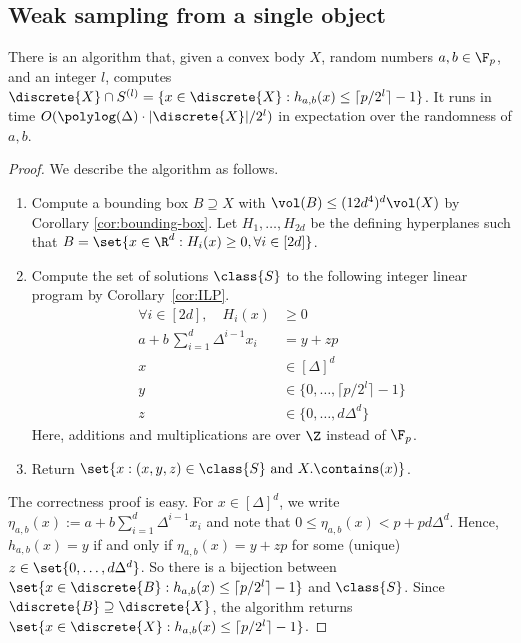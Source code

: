\subsection{Weak sampling from a single object}
\begin{lemma}
    \label{lem:single-weak-sample}
    There is an algorithm  that, given a convex body $X$, random numbers $a,b \in \F_p$, and an integer $l$, computes $\discrete{X} \cap S^{(l)} = \{x \in \discrete{X} : h_{a,b}(x) \leq \lceil p/2^l \rceil - 1\}$. It runs in time $O(\polylog(\Delta) \cdot |\discrete{X}| / 2^l)$ in expectation over the randomness of $a,b$.
\end{lemma}
%
\begin{proof}
    We describe the algorithm  as follows.
    \begin{enumerate}
        \item Compute a bounding box $B \supseteq X$ with $\vol(B) \leq (12d^4)^d \vol(X)$ by Corollary \ref{cor:bounding-box}. Let $H_1, \dots, H_{2d}$ be the defining hyperplanes such that $B = \set{x \in \R^d : H_i(x) \geq 0, \forall i \in [2d]}$.
%
        \item Compute the set of solutions $\class{S}$ to the following integer linear program by Corollary~\ref{cor:ILP}.
        \begin{align*}
            \forall i \in [2d], \quad H_i(x) &\geq 0 \quad \\
            a + b\,\sum_{i=1}^d \Delta^{i-1} x_i &= y + zp \\
            x &\in [\Delta]^d \\
            y &\in \{0, \dots, \lceil p/2^l \rceil - 1\} \\
            z &\in \{0, \dots, d\Delta^d\}
        \end{align*}
        Here, additions and multiplications are over $\Z$ instead of $\F_p$.
%
        \item Return $\set{x : (x,y,z) \in \class{S} \text{ and } X.\contains(x)}$.
    \end{enumerate}
%
    The correctness proof is easy. For $x \in [\Delta]^d$, we write $\eta_{a,b}(x) := a + b \sum_{i=1}^d \Delta^{i-1} x_i$ and note that $0 \leq \eta_{a,b}(x) < p + pd\Delta^d$. Hence, $h_{a,b}(x) = y$ if and only if $\eta_{a,b}(x) = y+zp$ for some (unique) $z \in \set{0, \dots, d\Delta^d}$. So there is a bijection between $\set{x \in \discrete{B} : h_{a,b}(x) \leq \lceil p/2^l \rceil - 1}$ and $\class{S}$. Since $\discrete{B} \supseteq \discrete{X}$, the algorithm returns $\set{x \in \discrete{X} : h_{a,b}(x) \leq \lceil p/2^l \rceil - 1}$.

\end{proof}
